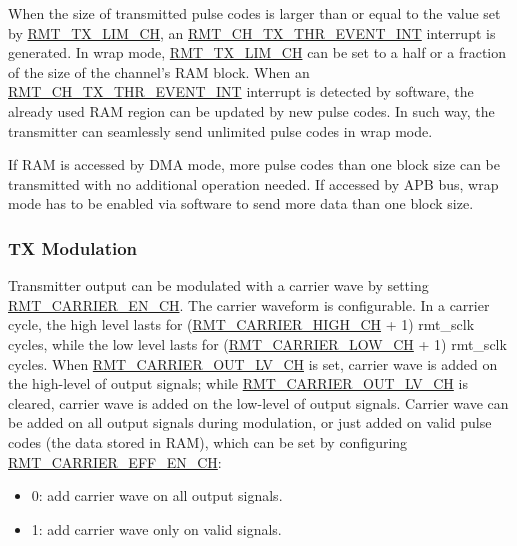 \documentclass[main\_\_EN.tex]{subfiles}
\begin{document}
When the size of transmitted pulse codes is larger than or equal to the value set by \hyperref[fielddesc:RMTTXLIMCHN]{RMT\_TX\_LIM\_CH}, an  \hyperref[int:RMTCHnTXTHREVENTINT]{RMT\_CH\_TX\_THR\_EVENT\_INT} interrupt is generated. In wrap mode,  \hyperref[fielddesc:RMTTXLIMCHN]{RMT\_TX\_LIM\_CH} can be set to a half or a fraction of the size of the channel's RAM block. When an  \hyperref[int:RMTCHnTXTHREVENTINT]{RMT\_CH\_TX\_THR\_EVENT\_INT} interrupt is detected by software, the already used RAM region can be updated by new pulse codes. In such way, the transmitter can seamlessly send unlimited pulse codes in wrap mode.
\begin{tiplisting}
If RAM is accessed by DMA mode, more pulse codes than one block size can be transmitted with no additional operation needed. If accessed by APB bus, wrap mode has to be enabled via software to send more data than one block size.
\end{tiplisting}

\subsubsection{TX Modulation}

Transmitter output can be modulated with a carrier wave by setting \hyperref[fielddesc:RMTCARRIERENCHN]{RMT\_CARRIER\_EN\_CH}. The carrier waveform is configurable. In a carrier cycle, the high level lasts for (\hyperref[fielddesc:RMTCARRIERHIGHCHN]{RMT\_CARRIER\_HIGH\_CH} + 1) rmt\_sclk cycles, while the low level lasts for (\hyperref[fielddesc:RMTCARRIERLOWCHN]{RMT\_CARRIER\_LOW\_CH} + 1) rmt\_sclk cycles. When  \hyperref[fielddesc:RMTCARRIEROUTLVCHN]{RMT\_CARRIER\_OUT\_LV\_CH} is set, carrier wave is added on the high-level of output signals; while \hyperref[fielddesc:RMTCARRIEROUTLVCHN]{RMT\_CARRIER\_OUT\_LV\_CH} is cleared, carrier wave is added on the low-level of output signals. Carrier wave can be added on all output signals during modulation, or just added on valid pulse codes (the data stored in RAM), which can be set by configuring  \hyperref[fielddesc:RMTCARRIEREFFENCHN]{RMT\_CARRIER\_EFF\_EN\_CH}:
\begin{itemize}
    \item 0: add carrier wave on all output signals.
    \item 1: add carrier wave only on valid signals.
\end{itemize}
\end{document}
